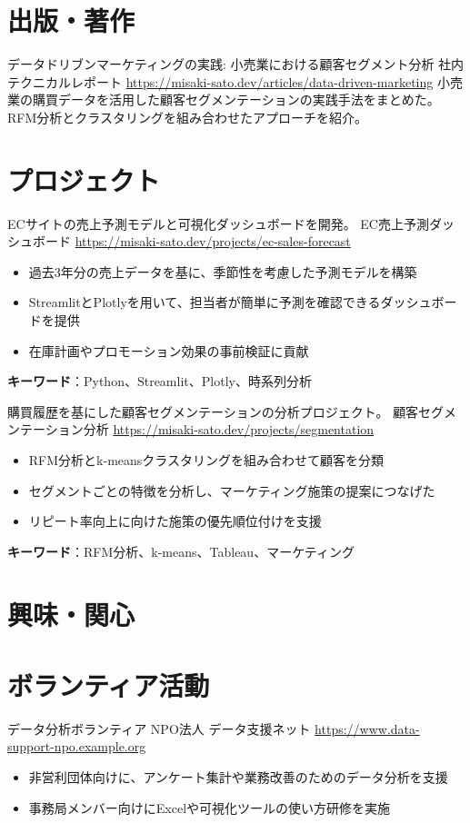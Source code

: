\documentclass[a4paper, serif, 10pt]{moderncv}
\begin{document}
\section{出版・著作}

        {データドリブンマーケティングの実践: 小売業における顧客セグメント分析}
        {社内テクニカルレポート}
        {\url{https://misaki-sato.dev/articles/data-driven-marketing}}
        {}
        {小売業の購買データを活用した顧客セグメンテーションの実践手法をまとめた。RFM分析とクラスタリングを組み合わせたアプローチを紹介。}
\section{プロジェクト}

        {ECサイトの売上予測モデルと可視化ダッシュボードを開発。}
        {EC売上予測ダッシュボード}
        {\url{https://misaki-sato.dev/projects/ec-sales-forecast}}
        {}
        {\begin{itemize}
\item 過去3年分の売上データを基に、季節性を考慮した予測モデルを構築
\item StreamlitとPlotlyを用いて、担当者が簡単に予測を確認できるダッシュボードを提供
\item 在庫計画やプロモーション効果の事前検証に貢献
\end{itemize}
\textbf{キーワード}：Python、Streamlit、Plotly、時系列分析}

        {購買履歴を基にした顧客セグメンテーションの分析プロジェクト。}
        {顧客セグメンテーション分析}
        {\url{https://misaki-sato.dev/projects/segmentation}}
        {}
        {\begin{itemize}
\item RFM分析とk-meansクラスタリングを組み合わせて顧客を分類
\item セグメントごとの特徴を分析し、マーケティング施策の提案につなげた
\item リピート率向上に向けた施策の優先順位付けを支援
\end{itemize}
\textbf{キーワード}：RFM分析、k-means、Tableau、マーケティング}
\section{興味・関心}

\section{ボランティア活動}

        {データ分析ボランティア}
        {NPO法人 データ支援ネット}
        {\url{https://www.data-support-npo.example.org}}
        {}
        {\begin{itemize}
\item 非営利団体向けに、アンケート集計や業務改善のためのデータ分析を支援
\item 事務局メンバー向けにExcelや可視化ツールの使い方研修を実施
\end{itemize}}
    
\end{document}
